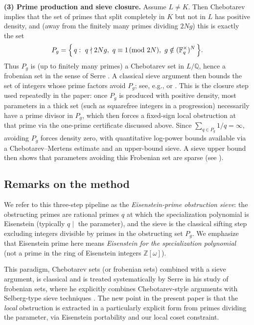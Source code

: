 \documentclass[11pt,letterpaper]{amsart}
\newcommand{\Z}{\mathbb{Z}}
\newcommand{\Q}{\mathbb{Q}}
\newcommand{\F}{\mathbb{F}}
\theoremstyle{plain}
\theoremstyle{definition}
\theoremstyle{remark}
\theoremstyle{plain}
\begin{document}
\smallskip\noindent
\textbf{(3) Prime production and sieve closure.}
Assume \(L\neq K\).  Then Chebotarev implies that the set of primes that split completely in \(K\) but not in \(L\)
has positive density, and (away from the finitely many primes dividing \(2Ng\)) this is exactly the set
\[
P_g=\Bigl\{\,q:\ q\nmid 2Ng,\ q\equiv 1\!\!\pmod{2N},\ g\notin(\F_q^\times)^N\,\Bigr\}.
\]
Thus \(P_g\) is (up to finitely many primes) a Chebotarev set in \(L/\Q\), hence a frobenian set in the sense of
Serre \cite{SerreChebotarev}.  A classical sieve argument then bounds the set of integers whose prime factors avoid \(P_g\); see, e.g., \cite[Ch.~5]{HR74} or \cite[\S6.4]{IK04}.
This is the closure step used repeatedly in the paper: once \(P_g\) is produced with positive density, most parameters in a thick set (such as squarefree integers in a progression) necessarily have a
prime divisor in \(P_g\), which then forces a fixed-sign local obstruction at that prime via the one-prime
certificate discussed above. Since $\sum_{q\in P_g}1/q=\infty$, avoiding $P_g$ forces density zero, with quantitative log-power bounds
available via a Chebotarev--Mertens estimate and an upper-bound sieve. A sieve upper bound then shows that
parameters avoiding this Frobenian set are sparse (see \cite{HR74,AKK22}).

\subsection*{Remarks on the method}
We refer to this three-step pipeline as the \emph{Eisenstein-prime obstruction sieve}: the obstructing primes are rational primes \(q\) at which the specialization polynomial is Eisenstein
(typically \(q\mid\) the parameter), and the sieve is the classical sifting step excluding integers divisible by primes in the obstructing set \(P_g\). We emphasize that Eisenstein prime here means \emph{Eisenstein for the specialization polynomial} (not a prime in the ring of Eisenstein integers \(\Z[\omega]\)). 

This paradigm, Chebotarev sets (or frobenian sets) combined with a sieve argument, is classical and is treated systematically by Serre in his study of frobenian sets, where he explicitly combines Chebotarev-style arguments with Selberg-type sieve techniques \cite{SerreChebotarev}.  The new point in the present paper is that the \emph{local} obstruction is extracted in a particularly explicit form from primes dividing the parameter, via Eisenstein portability and our local coset constraint.
\end{document}
